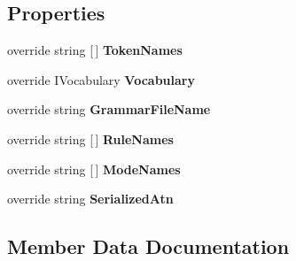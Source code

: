 \subsection*{Properties}
\begin{DoxyCompactItemize}
\item 
\mbox{\label{classzlua_1_1_lua_lexer_a1b8e8c1afcbf494a5e92320727221eeb}} 
override string \mbox{[}$\,$\mbox{]} {\bfseries Token\+Names}
\item 
\mbox{\label{classzlua_1_1_lua_lexer_a80e16e470aa3e8ad4732c86fc947f8a3}} 
override I\+Vocabulary {\bfseries Vocabulary}
\item 
\mbox{\label{classzlua_1_1_lua_lexer_a27ba48a0cf7c1af17de2518c17ac6aae}} 
override string {\bfseries Grammar\+File\+Name}
\item 
\mbox{\label{classzlua_1_1_lua_lexer_a629dc6fd3425e251174109bc200f2155}} 
override string \mbox{[}$\,$\mbox{]} {\bfseries Rule\+Names}
\item 
\mbox{\label{classzlua_1_1_lua_lexer_af4fd029a68d26ac9dca54e6da6eebb72}} 
override string \mbox{[}$\,$\mbox{]} {\bfseries Mode\+Names}
\item 
\mbox{\label{classzlua_1_1_lua_lexer_a2a036a6ba3ea3e38dfdb097d4f70f268}} 
override string {\bfseries Serialized\+Atn}
\end{DoxyCompactItemize}


\subsection{Member Data Documentation}
\mbox{\label{classzlua_1_1_lua_lexer_a9ca8ded7d46d05209f23cc792243a0b9}} 

